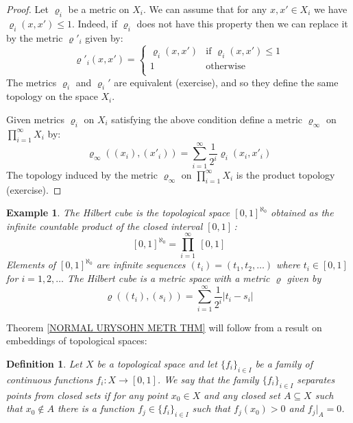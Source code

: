 \documentclass[11pt, letterpaper, oneside]{report}
\theoremstyle{pplain}
\newtheorem{ITERMVALUE THM}[theorem]{Intermediate Value Theorem}
\newtheorem{HEINEBOREL THM}[theorem]{Heine-Borel Theorem}
\newtheorem{UMETR THM}[theorem]{Urysohn Metrization Theorem}
\newtheorem{UMETR2 THM}[theorem]{Urysohn Metrization Theorem (v.2)}
\theoremstyle{ddefinition}
\newtheorem{definition}[theorem]{Definition}
\newtheorem{example}[theorem]{Example}
\theoremstyle{nnn}
\newtheorem{TDA NN}[theorem]{Topological Data Analysis. }
\theoremstyle{eexercise}
\begin{document}
\begin{proof}
Let $\varrho_{i}$ be a metric on $X_{i}$. We can assume that for any $x, x'\in X_{i}$
we have $\varrho_{i}(x, x') \leq 1$. Indeed, if $\varrho_{i}$ does not have this property
then we can replace it by the metric $\varrho'_{i}$ given by:
$$
\varrho'_{i}(x, x') =
\begin{cases}
\varrho_{i}(x, x') & \text{if $\varrho_{i}(x, x') \leq 1$} \\
1 & \text{otherwise} \\
\end{cases}
$$
The metrics $\varrho_{i}$ and $\varrho_{i}'$ are equivalent (exercise), and so they define the
same topology on the space $X_{i}$.

Given metrics $\varrho_{i}$ on $X_{i}$ satisfying the above condition define a metric
$\varrho_{\infty}$ on $\prod_{i=1}^{\infty} X_{i}$ by:
$$\varrho_{\infty}((x_{i}), (x'_{i})) = \sum_{i=1}^{\infty} \frac{1}{2^{i}}\varrho_{i}(x_{i}, x'_{i})$$
The topology induced by the metric $\varrho_{\infty}$ on $\prod_{i=1}^{\infty}X_{i}$ is the 
product topology (exercise). 
\end{proof}

\begin{example}
\label{HILBERT CUBE EX}
The \emph{Hilbert cube} is the topological space $[0, 1]^{\aleph_{0}}$  obtained as 
the infinite countable  product of the closed interval $[0, 1]\,$:
$$[0, 1]^{\aleph_{0}} = \prod_{i=1}^{\infty}\ [0, 1]$$
Elements of $[0, 1]^{\aleph_{0}}$ are infinite sequences $(t_{i}) = (t_{1}, t_{2}, \dots)$
where $t_{i}\in [0, 1]$ for $i=1, 2, \dots$ 
The Hilbert cube is a metric space with a metric $\varrho$ given by 
$$\varrho((t_{i}), (s_{i})) = \sum_{i=1}^{\infty} \frac{1}{2^{i}}|t_{i}-s_{i}|$$
\end{example}


Theorem \ref{NORMAL URYSOHN METR THM} will follow from a result 
on embeddings of topological spaces: 


\begin{definition}
\label{SEP PTCLO FAMILY DEF}
Let $X$ be a topological space and let $\{f_{i}\}_{i\in I}$ be a family of continuous 
functions $f_{i}\colon X \to [0, 1]$. We say that the family $\{f_{i}\}_{i\in I}$ 
\emph{separates points from closed sets} if for any point $x_{0}\in X$ and any closed set 
$A\subseteq X$ such that $x_{0}\not\in A$ there is a function $f_{j}\in \{f_{i}\}_{i\in I}$
such that $f_{j}(x_{0}) > 0$ and $f_{j}|_{A} = 0$.    
\end{definition}
\end{document}
